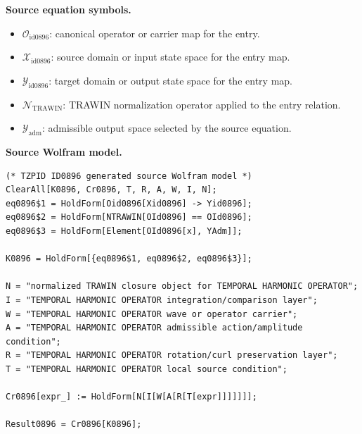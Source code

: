 \begin{minipage}[t]{0.49\linewidth}
\begingroup
\small
\raggedright
\textbf{Source equation symbols.}\par
\begin{itemize}[leftmargin=1.35em,itemsep=1pt,topsep=1pt,parsep=0pt]
    \item $\mathcal{O}_{\mathrm{id0896}}$: canonical operator or carrier map for the entry.
    \item $\mathcal{X}_{\mathrm{id0896}}$: source domain or input state space for the entry map.
    \item $\mathcal{Y}_{\mathrm{id0896}}$: target domain or output state space for the entry map.
    \item $\mathcal{N}_{\mathrm{TRAWIN}}$: TRAWIN normalization operator applied to the entry relation.
    \item $\mathcal{Y}_{\mathrm{adm}}$: admissible output space selected by the source equation.
\end{itemize}
\endgroup
\end{minipage}\hfill
\begin{minipage}[t]{0.47\linewidth}
\begingroup
\scriptsize
\raggedright
\textbf{Source Wolfram model.}\par
\begin{Verbatim}[fontsize=\tiny,breaklines=true,breakanywhere=true]
(* TZPID ID0896 generated source Wolfram model *)
ClearAll[K0896, Cr0896, T, R, A, W, I, N];
eq0896$1 = HoldForm[Oid0896[Xid0896] -> Yid0896];
eq0896$2 = HoldForm[NTRAWIN[OId0896] == OId0896];
eq0896$3 = HoldForm[Element[OId0896[x], YAdm]];

K0896 = HoldForm[{eq0896$1, eq0896$2, eq0896$3}];

N = "normalized TRAWIN closure object for TEMPORAL HARMONIC OPERATOR";
I = "TEMPORAL HARMONIC OPERATOR integration/comparison layer";
W = "TEMPORAL HARMONIC OPERATOR wave or operator carrier";
A = "TEMPORAL HARMONIC OPERATOR admissible action/amplitude condition";
R = "TEMPORAL HARMONIC OPERATOR rotation/curl preservation layer";
T = "TEMPORAL HARMONIC OPERATOR local source condition";

Cr0896[expr_] := HoldForm[N[I[W[A[R[T[expr]]]]]]];

Result0896 = Cr0896[K0896];
\end{Verbatim}
\endgroup
\end{minipage}

